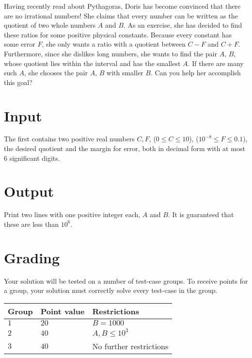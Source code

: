 \noindent
Having recently read about Pythagoras, Doris has become convinced that there are no irrational numbers!
She claims that every number can be written as the quotient of two whole numbers $A$ and $B$.
As an exercise, she has decided to find these ratios for some positive physical constants.
Because every constant has some error $F$, she only wants a ratio with a quotient between $C-F$ and $C+F$.
Furthermore, since she dislikes long numbers, she wants to find the pair $A$, $B$, whose quotient lies within the interval and has the smallest $A$. If there are many such $A$, she chooses the pair $A$, $B$ with smaller $B$.
Can you help her accomplish this goal?

\section*{Input}
\noindent
The first contains two positive real numbers $C, F$, ($0 \leq C \leq 10$), ($10^{-8} \leq F \leq 0.1$), the desired quotient and the margin for error, both in decimal form with at most 6 significant digits.

\section*{Output}
\noindent
Print two lines with one positive integer each, $A$ and $B$. It is guaranteed that these are less than $10^6$.

\section*{Grading}
\noindent
Your solution will be tested on a number of test-case groups.
To receive points for a group, your solution must correctly solve every test-case in the group.

\noindent
\begin{tabular}{| l | l | l |}
\hline
  Group & Point value & Restrictions \\ \hline
  $1$    & $20$       &  $B = 1000$ \\ \hline 
  $2$    & $40$       &  $A, B \leq 10^{3}$ \\ \hline
  $3$    & $40$       &  No further restrictions \\ \hline
\end{tabular}
